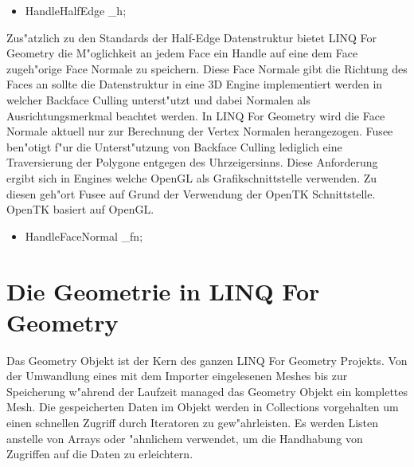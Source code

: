 \documentclass[pagesize, paper=a4, fontsize=12pt,titlepage=true, headings=small, headnosepline, abstractoff, liststotoc, nochapterprefix, plainheadsepline]{scrreprt}
\newcommand{\LFG}{LINQ For Geometry}
\newcommand{\LFGS}{LINQ For Geometry }
\newcommand{\HES}{Half-Edge Datenstruktur }
\begin{document}
\begin{itemize}
\item HandleHalfEdge \_h;
\end{itemize}

Zus"atzlich zu den Standards der \HES bietet \LFGS die M"oglichkeit an jedem Face ein Handle auf eine dem Face zugeh"orige Face Normale zu speichern. Diese Face Normale gibt die Richtung des Faces an sollte die Datenstruktur in eine 3D Engine implementiert werden in welcher Backface Culling unterst"utzt und dabei Normalen als Ausrichtungsmerkmal beachtet werden. In \LFGS wird die Face Normale aktuell nur zur Berechnung der Vertex Normalen herangezogen. Fusee ben"otigt f"ur die Unterst"utzung von Backface Culling lediglich eine Traversierung der Polygone entgegen des Uhrzeigersinns. Diese Anforderung ergibt sich in Engines welche OpenGL als Grafikschnittstelle verwenden. Zu diesen geh"ort Fusee auf Grund der Verwendung der OpenTK Schnittstelle. OpenTK basiert auf OpenGL.
\begin{itemize}
\item HandleFaceNormal \_fn;
\end{itemize}
\newpage
	\section {Die Geometrie in \LFG}
			Das Geometry Objekt ist der Kern des ganzen \LFGS Projekts. Von der Umwandlung eines mit dem Importer eingelesenen Meshes bis zur Speicherung w"ahrend der Laufzeit managed das Geometry Objekt ein komplettes Mesh. Die gespeicherten Daten im Objekt werden in Collections vorgehalten um einen schnellen Zugriff durch Iteratoren zu gew"ahrleisten. Es werden Listen anstelle von Arrays oder "ahnlichem verwendet, um die Handhabung von Zugriffen auf die Daten zu erleichtern.
\end{document}
